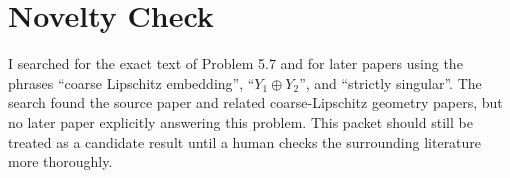 \documentclass[11pt]{article}
\begin{document}
\section*{Novelty Check}

I searched for the exact text of Problem 5.7 and for later papers using
the phrases ``coarse Lipschitz embedding'', ``$Y_1\oplus Y_2$'', and
``strictly singular''. The search found the source paper and related
coarse-Lipschitz geometry papers, but no later paper explicitly answering
this problem. This packet should still be treated as a candidate result
until a human checks the surrounding literature more thoroughly.
\end{document}
